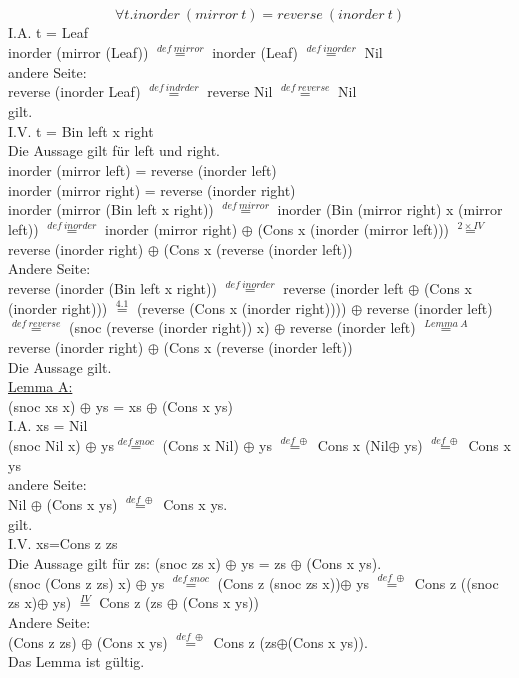 \documentclass{article}
\theoremstyle{definition}
\begin{document}
	\subsection{}
	\[\forall t. inorder\ (mirror\ t) = reverse\ (inorder\ t)\]
	I.A. t = Leaf\\
	inorder (mirror (Leaf)) $\stackrel{def\ mirror}{=}$ inorder (Leaf) $\stackrel{def\ inorder}{=}$ Nil\\
	andere Seite:\\
	reverse (inorder Leaf) $\stackrel{def\ indrder}{=}$ reverse Nil $\stackrel{def\ reverse}{=}$ Nil\\
	gilt.\\
	I.V. t = Bin left x right\\
	Die Aussage gilt für left und right.\\ 
	inorder (mirror left) = reverse (inorder left)\\
	inorder (mirror right) = reverse (inorder right)\\
	inorder (mirror (Bin left x right)) $\stackrel{def\ mirror}{=}$ inorder (Bin (mirror right) x (mirror left)) $\stackrel{def\ inorder}{=}$ inorder (mirror right) $\oplus$ (Cons x (inorder (mirror left))) $\stackrel{2\times IV}{=}$  reverse (inorder right) $\oplus$ (Cons x (reverse (inorder left))\\
	Andere Seite:\\
	reverse (inorder (Bin left x right)) $\stackrel{def\ inorder}{=}$ reverse (inorder left $\oplus$ (Cons x (inorder right))) $\stackrel{4.1}{=}$  (reverse (Cons x (inorder right)))) $\oplus$ reverse (inorder left) $\stackrel{def\ reverse}{=}$ (snoc (reverse (inorder right)) x) $\oplus$ reverse (inorder left) $\stackrel{Lemma\ A}{=}$\\
	reverse (inorder right) $\oplus$ (Cons x (reverse (inorder left))\\
	Die Aussage gilt.\\
	\underline{Lemma A:}\\
	(snoc xs x) $\oplus$ ys = xs $\oplus$ (Cons x ys)\\
	I.A. xs = Nil\\
	(snoc Nil x) $\oplus$ ys$\stackrel{def\ snoc}{=}$ (Cons x Nil) $\oplus$ ys $\stackrel{def\ \oplus}{=}$ Cons x (Nil$\oplus$ ys) $\stackrel{def\ \oplus}{=}$ Cons x ys \\
	andere Seite:\\
	Nil $\oplus$ (Cons x ys) $\stackrel{def\ \oplus}{=}$ Cons x ys.\\
	gilt.\\
	I.V. xs=Cons z zs\\
	Die Aussage gilt für zs: (snoc zs x) $\oplus$ ys = zs $\oplus$ (Cons x ys).\\
	(snoc (Cons z zs) x) $\oplus$ ys $\stackrel{def\ snoc}{=}$ (Cons z (snoc  zs x))$\oplus$ ys $\stackrel{def\ \oplus}{=}$ Cons z ((snoc zs x)$\oplus$ ys) $\stackrel{IV}{=}$ Cons z (zs $\oplus$ (Cons x ys))\\
	Andere Seite:\\
	(Cons z zs) $\oplus$ (Cons x ys) $\stackrel{def\ \oplus}{=}$  Cons z (zs$\oplus$(Cons x ys)).\\
	Das Lemma ist gültig.\\
\end{document}
